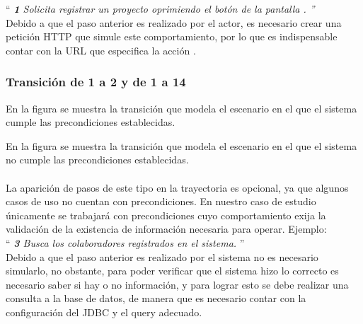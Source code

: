 {``\it
    {\bf 1} \UCactor Solicita registrar un proyecto oprimiendo el botón  de la pantalla .
''}\\
	
	Debido a que el paso anterior es realizado por el actor, es necesario crear una petición HTTP que simule este comportamiento, por lo que es indispensable contar con la URL que especifica la acción .\\
		
	
\subsubsection{Transición de 1 a 2 y de 1 a 14}
   
En la figura  se muestra la transición que modela el escenario en el que el sistema cumple las precondiciones establecidas.
  
   
En la figura  se muestra la transición que modela el escenario en el que el sistema no cumple las precondiciones establecidas.\\\\
  
  
 La aparición de pasos de este tipo en la trayectoria es opcional, ya que algunos casos de uso no cuentan con precondiciones. En nuestro caso de estudio únicamente se trabajará con precondiciones cuyo comportamiento exija la validación de la existencia de información necesaria para operar. Ejemplo:\\

``{\it
     {\bf 3} \UCsist Busca los colaboradores registrados en el sistema. 
 }''\\
	
	Debido a que el paso anterior es realizado por el sistema no es necesario simularlo, no obstante, para poder verificar que el sistema hizo lo correcto es necesario saber si hay o no información, y para lograr esto se debe realizar una consulta a la base de datos, de manera que es necesario contar con la configuración del JDBC y el query adecuado.\\
	
